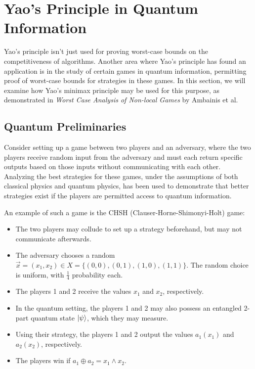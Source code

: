 \section{Yao's Principle in Quantum Information}

Yao's principle isn't just used for proving worst-case bounds on the competitiveness of algorithms. Another area where Yao's principle has found an application is in the study of certain games in quantum information, permitting proof of worst-case bounds for strategies in these games. In this section, we will examine how Yao's minimax principle may be used for this purpose, as demonstrated in \emph{Worst Case Analysis of Non-local Games} by Ambainis et al.


\subsection{Quantum Preliminaries}

Consider setting up a game between two players and an adversary, where the two players receive random input from the adversary and must each return specific outputs based on those inputs without communicating with each other. Analyzing the best strategies for these games, under the assumptions of both classical physics and quantum physics, has been used to demonstrate that better strategies exist if the players are permitted access to quantum information.

An example of such a game is the CHSH (Clauser-Horne-Shimonyi-Holt) game:

\begin{itemize}
\item{The two players may collude to set up a strategy beforehand, but may not communicate afterwards.}
\item{The adversary chooses a random $\vec{x}=(x_1, x_2) \in X=\{(0,0), (0,1), (1,0), (1,1)\}$. The random choice is uniform, with $\frac14$ probability each.}
\item{The players 1 and 2 receive the values $x_1$ and $x_2$, respectively.}
\item{In the quantum setting, the players 1 and 2 may also possess an entangled 2-part quantum state $\ket{\psi}$, which they may measure.}
\item{Using their strategy, the players 1 and 2 output the values $a_1(x_1)$ and $a_2(x_2)$, respectively.}
\item{The players win if $a_1 \oplus a_2 = x_1 \wedge x_2$.}
\end{itemize}

